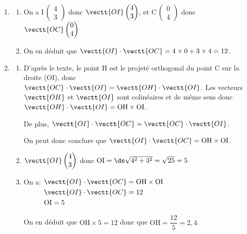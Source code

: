 \begin{enumerate}
\item 
	\begin{enumerate}
		\item 
On a I\,$\begin{pmatrix} 4\\3 \end{pmatrix}$ donc
$\vectt{OI} \begin{pmatrix} 4\\3 \end{pmatrix}$,
et
C\,$\begin{pmatrix} 0\\4 \end{pmatrix}$ donc
$\vectt{OC} \begin{pmatrix} 0\\4 \end{pmatrix}$

		\item 
On en déduit que
$\vectt{OI}\cdot \vectt{OC}=4\times 0 + 3\times 4 = 12$.		
	\end{enumerate}
	
\item 
	\begin{enumerate}
		\item 
D'après le texte, le point H est le projeté orthogonal du point C sur la droite (OI), donc
$\vectt{OC}\cdot \vectt{OI} = \vectt{OH}\cdot \vectt{OI}$.
Les vecteurs $ \vectt{OH}$ et $\vectt{OI}$ sont colinéaires et de même sens donc $\vectt{OH}\cdot \vectt{OI}= \text{OH}\times \text{OI}$.

De plus, $\vectt{OI}\cdot \vectt{OC} = \vectt{OC}\cdot \vectt{OI}$.

On peut donc conclure que $\vectt{OI}\cdot \vectt{OC} = \text{OH}\times \text{OI}$.

		\item 
$\vectt{OI} \begin{pmatrix} 4\\3 \end{pmatrix}$ donc $\text{OI} = \ds\sqrt{4^2+3^2} = \sqrt{25} = 5$

		\item 
On a: $\begin{aligned}[t]
 & \vectt{OI}\cdot \vectt{OC} = \text{OH}\times \text{OI}\\
& \vectt{OI}\cdot \vectt{OC} = 12\\
& \text{OI}=5
\end{aligned}$

On en déduit que $\text{OH}\times 5=12$ donc que $\text{OH} = \dfrac{12}{5}=2,4$.


\end{enumerate}
\end{enumerate}
